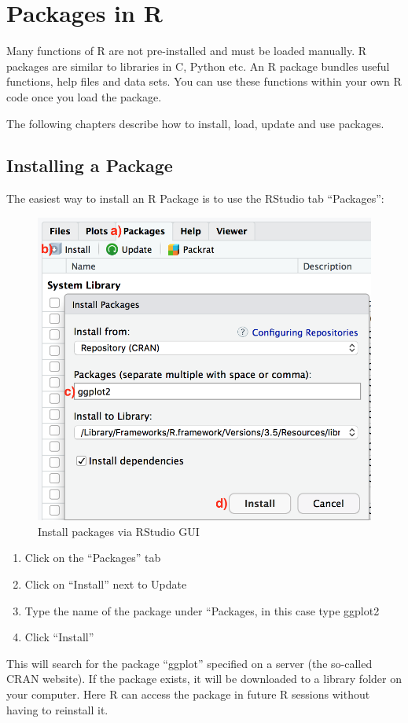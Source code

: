 \documentclass[
  a4paperpaper,
]{book}
\begin{document}
\hypertarget{packages}{%
\chapter{Packages in R}\label{packages}}

Many functions of R are not pre-installed and must be loaded manually. R packages are similar to libraries in C, Python etc. An R package bundles useful functions, help files and data sets. You can use these functions within your own R code once you load the package.

The following chapters describe how to install, load, update and use packages.

\newpage

\hypertarget{installing-a-package}{%
\section{Installing a Package}\label{installing-a-package}}

The easiest way to install an R Package is to use the RStudio tab ``Packages'':

\begin{figure}
\includegraphics[width=0.5\linewidth]{images/a2-installPackagesRStudio} \caption{Install packages via RStudio GUI}\label{fig:knitr-logo}
\end{figure}

\begin{enumerate}
\def\labelenumi{\alph{enumi})}
\item
  Click on the ``Packages'' tab
\item
  Click on ``Install'' next to Update
\item
  Type the name of the package under ``Packages, in this case type ggplot2
\item
  Click ``Install''
\end{enumerate}

This will search for the package ``ggplot'' specified on a server (the so-called CRAN website). If the package exists, it will be downloaded to a library folder on your computer. Here R can access the package in future R sessions without having to reinstall it.
\end{document}
